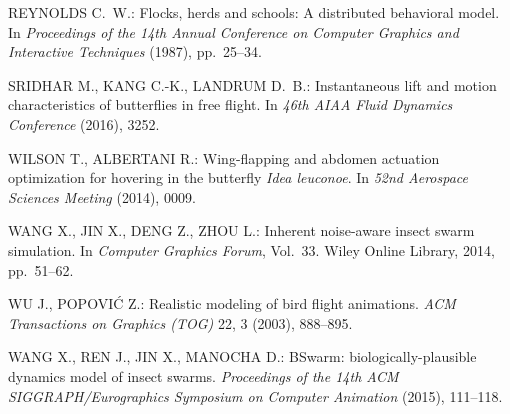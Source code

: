 \documentclass[12pt]{article}
\begin{document}
\medskip\noindent
[Rey87] REYNOLDS C.~W.: Flocks, herds and schools: A distributed behavioral
model. In \textit{Proceedings of the 14th Annual Conference on Computer
Graphics and Interactive Techniques} (1987), pp.~25--34.

\medskip\noindent
[SKL16] SRIDHAR M., KANG C.-K., LANDRUM D.~B.: Instantaneous lift and
motion characteristics of butterflies in free flight. In \textit{46th AIAA
Fluid Dynamics Conference} (2016), 3252.

\medskip\noindent
[WA14] WILSON T., ALBERTANI R.: Wing-flapping and abdomen actuation
optimization for hovering in the butterfly \textit{Idea leuconoe}. In
\textit{52nd Aerospace Sciences Meeting} (2014), 0009.

\medskip\noindent
[WJDZ14] WANG X., JIN X., DENG Z., ZHOU L.: Inherent noise-aware insect
swarm simulation. In \textit{Computer Graphics Forum}, Vol.~33. Wiley Online
Library, 2014, pp.~51--62.

\medskip\noindent
[WP03] WU J., POPOVI\'C Z.: Realistic modeling of bird flight animations.
\textit{ACM Transactions on Graphics (TOG)} 22, 3 (2003), 888--895.

\medskip\noindent
[WRJM15] WANG X., REN J., JIN X., MANOCHA D.: BSwarm:
biologically-plausible dynamics model of insect swarms.
\textit{Proceedings of the 14th ACM SIGGRAPH/Eurographics Symposium on
Computer Animation} (2015), 111--118.

\newpage
\end{document}
